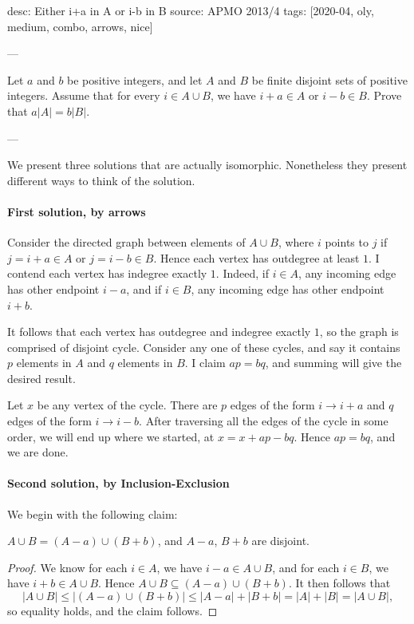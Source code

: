 desc: Either i+a in A or i-b in B
source: APMO 2013/4
tags: [2020-04, oly, medium, combo, arrows, nice]

---

Let $a$ and $b$ be positive integers, and let $A$ and $B$ be finite disjoint sets of positive integers. Assume that for every $i\in A\cup B$, we have $i+a\in A$ or $i-b\in B$. Prove that $a|A|=b|B|$.

---

We present three solutions that are actually isomorphic. Nonetheless they present different ways to think of the solution.

\paragraph{First solution, by arrows} Consider the directed graph between elements of $A\cup B$, where $i$ points to $j$ if $j=i+a\in A$ or $j=i-b\in B$. Hence each vertex has outdegree at least $1$. I contend each vertex has indegree exactly $1$. Indeed, if $i\in A$, any incoming edge has other endpoint $i-a$, and if $i\in B$, any incoming edge has other endpoint $i+b$.

It follows that each vertex has outdegree and indegree exactly $1$, so the graph is comprised of disjoint cycle. Consider any one of these cycles, and say it contains $p$ elements in $A$ and $q$ elements in $B$. I claim $ap=bq$, and summing will give the desired result.

Let $x$ be any vertex of the cycle. There are $p$ edges of the form $i\to i+a$ and $q$ edges of the form $i\to i-b$. After traversing all the edges of the cycle in some order, we will end up where we started, at $x=x+ap-bq$. Hence $ap=bq$, and we are done.

\paragraph{Second solution, by Inclusion-Exclusion} We begin with the following claim:
\begin{claim*}
    $A\cup B=(A-a)\cup(B+b)$, and $A-a$, $B+b$ are disjoint.
\end{claim*}
\begin{proof}
    We know for each $i\in A$, we have $i-a\in A\cup B$, and for each $i\in B$, we have $i+b\in A\cup B$. Hence $A\cup B\subseteq(A-a)\cup(B+b)$. It then follows that \[|A\cup B|\le|(A-a)\cup(B+b)|\le|A-a|+|B+b|=|A|+|B|=|A\cup B|,\]
    so equality holds, and the claim follows.
\end{proof}

